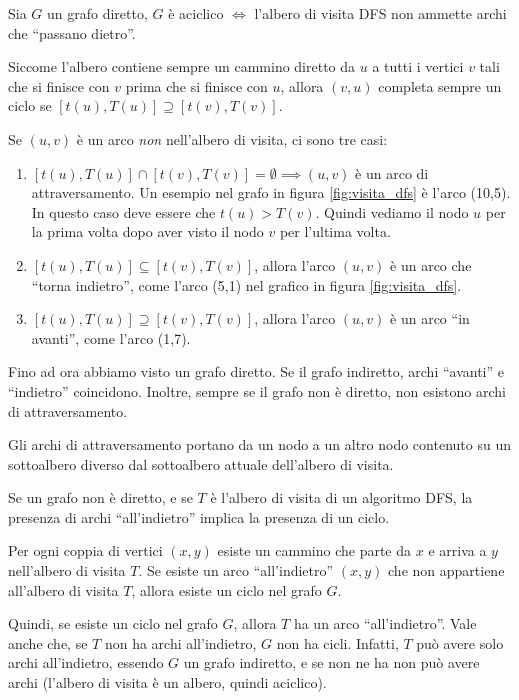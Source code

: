 \begin{prop}
Sia $G$ un grafo diretto, $G$ \`e aciclico $\iff$ l'albero di visita DFS non ammette archi che ``passano dietro''.
\end{prop}

Siccome l'albero contiene sempre un cammino diretto da $u$ a tutti i vertici $v$ tali che si finisce con $v$ prima che si finisce con $u$, allora $(v,u)$ completa sempre un ciclo se $[t(u), T(u)] \supseteq [t(v), T(v)]$. 

Se $(u,v)$ \`e un arco \emph{non} nell'albero di visita, ci sono tre casi:
\begin{enumerate}
    \item $[t(u), T(u)] \cap [t(v), T(v)] = \emptyset \implies (u,v)$ \`e un arco di attraversamento. Un esempio nel grafo in figura  \ref{fig:visita_dfs} \`e l'arco (10,5). In questo caso deve essere che $t(u) > T(v)$. Quindi vediamo il nodo $u$ per la prima volta dopo aver visto il nodo $v$ per l'ultima volta.
    \item $[t(u), T(u)] \subseteq [t(v), T(v)]$, allora l'arco $(u,v)$ \`e un arco che ``torna indietro'', come l'arco (5,1) nel grafico in figura \ref{fig:visita_dfs}.
    \item $[t(u), T(u)] \supseteq [t(v), T(v)]$, allora l'arco $(u,v)$ \`e un arco ``in avanti'', come l'arco (1,7).
\end{enumerate}

Fino ad ora abbiamo visto un grafo diretto. Se il grafo indiretto, archi ``avanti'' e ``indietro'' coincidono. Inoltre, sempre se il grafo non \`e diretto, non esistono archi di attraversamento.

Gli archi di attraversamento portano da un nodo a un altro nodo contenuto su un sottoalbero diverso dal sottoalbero attuale dell'albero di visita.

Se un grafo non \`e diretto, e se $T$ \`e l'albero di visita di un algoritmo DFS, la presenza di archi ``all'indietro'' implica la presenza di un ciclo.

Per ogni coppia di vertici $(x,y)$ esiste un cammino che parte da $x$ e arriva a $y$ nell'albero di visita $T$. Se esiste un arco ``all'indietro'' $(x,y)$ che non appartiene all'albero di visita $T$, allora esiste un ciclo nel grafo $G$.

Quindi, se esiste un ciclo nel grafo $G$, allora $T$ ha un arco ``all'indietro''. Vale anche che, se $T$ non ha archi all'indietro, $G$ non ha cicli. Infatti, $T$ pu\`o avere solo archi all'indietro, essendo $G$ un grafo indiretto, e se non ne ha non pu\`o avere archi (l'albero di visita \`e un albero, quindi aciclico).

